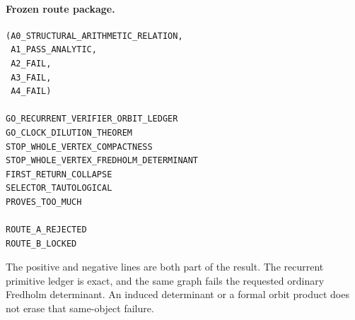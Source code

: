 \paragraph{Frozen route package.}
\begin{verbatim}
(A0_STRUCTURAL_ARITHMETIC_RELATION,
 A1_PASS_ANALYTIC,
 A2_FAIL,
 A3_FAIL,
 A4_FAIL)

GO_RECURRENT_VERIFIER_ORBIT_LEDGER
GO_CLOCK_DILUTION_THEOREM
STOP_WHOLE_VERTEX_COMPACTNESS
STOP_WHOLE_VERTEX_FREDHOLM_DETERMINANT
FIRST_RETURN_COLLAPSE
SELECTOR_TAUTOLOGICAL
PROVES_TOO_MUCH

ROUTE_A_REJECTED
ROUTE_B_LOCKED
\end{verbatim}

The positive and negative lines are both part of the result.  The recurrent
primitive ledger is exact, and the same graph fails the requested ordinary
Fredholm determinant.  An induced determinant or a formal orbit product does
not erase that same-object failure.
